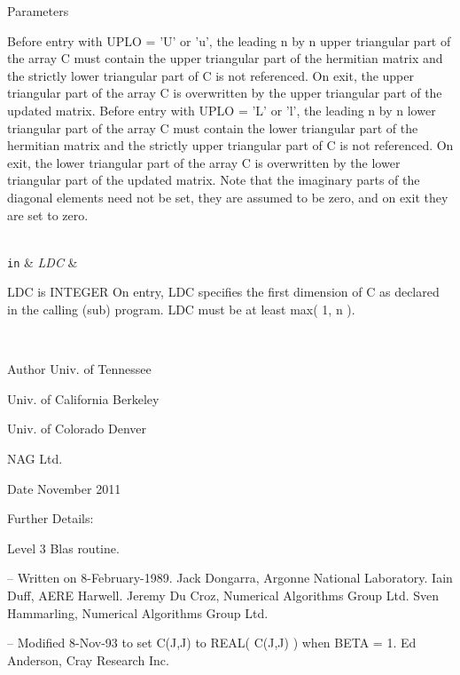 \begin{DoxyParams}[1]{Parameters}
\begin{DoxyVerb}
           Before entry  with  UPLO = 'U' or 'u',  the leading  n by n
           upper triangular part of the array C must contain the upper
           triangular part  of the  hermitian matrix  and the strictly
           lower triangular part of C is not referenced.  On exit, the
           upper triangular part of the array  C is overwritten by the
           upper triangular part of the updated matrix.
           Before entry  with  UPLO = 'L' or 'l',  the leading  n by n
           lower triangular part of the array C must contain the lower
           triangular part  of the  hermitian matrix  and the strictly
           upper triangular part of C is not referenced.  On exit, the
           lower triangular part of the array  C is overwritten by the
           lower triangular part of the updated matrix.
           Note that the imaginary parts of the diagonal elements need
           not be set,  they are assumed to be zero,  and on exit they
           are set to zero.\end{DoxyVerb}
\\
\hline
\mbox{\tt in}  & {\em L\+D\+C} & \begin{DoxyVerb}          LDC is INTEGER
           On entry, LDC specifies the first dimension of C as declared
           in  the  calling  (sub)  program.   LDC  must  be  at  least
           max( 1, n ).\end{DoxyVerb}
 \\
\hline
\end{DoxyParams}
\begin{DoxyAuthor}{Author}
Univ. of Tennessee 

Univ. of California Berkeley 

Univ. of Colorado Denver 

N\+A\+G Ltd. 
\end{DoxyAuthor}
\begin{DoxyDate}{Date}
November 2011 
\end{DoxyDate}
\begin{DoxyParagraph}{Further Details\+: }
\begin{DoxyVerb}  Level 3 Blas routine.

  -- Written on 8-February-1989.
     Jack Dongarra, Argonne National Laboratory.
     Iain Duff, AERE Harwell.
     Jeremy Du Croz, Numerical Algorithms Group Ltd.
     Sven Hammarling, Numerical Algorithms Group Ltd.

  -- Modified 8-Nov-93 to set C(J,J) to REAL( C(J,J) ) when BETA = 1.
     Ed Anderson, Cray Research Inc.\end{DoxyVerb}
 
\end{DoxyParagraph}
\hypertarget{group__complex__blas__level3_ga2490eea9e962fd69b9902e22aaa3a634}{}

